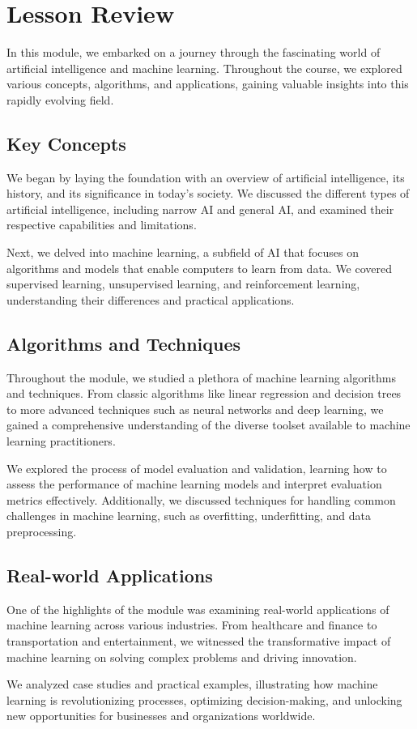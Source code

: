 
\section{Lesson Review}

In this module, we embarked on a journey through the fascinating world of artificial intelligence and machine learning. Throughout the course, we explored various concepts, algorithms, and applications, gaining valuable insights into this rapidly evolving field.

\subsection*{Key Concepts}

We began by laying the foundation with an overview of artificial intelligence, its history, and its significance in today's society. We discussed the different types of artificial intelligence, including narrow AI and general AI, and examined their respective capabilities and limitations.

Next, we delved into machine learning, a subfield of AI that focuses on algorithms and models that enable computers to learn from data. We covered supervised learning, unsupervised learning, and reinforcement learning, understanding their differences and practical applications.

\subsection*{Algorithms and Techniques}

Throughout the module, we studied a plethora of machine learning algorithms and techniques. From classic algorithms like linear regression and decision trees to more advanced techniques such as neural networks and deep learning, we gained a comprehensive understanding of the diverse toolset available to machine learning practitioners.

We explored the process of model evaluation and validation, learning how to assess the performance of machine learning models and interpret evaluation metrics effectively. Additionally, we discussed techniques for handling common challenges in machine learning, such as overfitting, underfitting, and data preprocessing.

\subsection*{Real-world Applications}

One of the highlights of the module was examining real-world applications of machine learning across various industries. From healthcare and finance to transportation and entertainment, we witnessed the transformative impact of machine learning on solving complex problems and driving innovation.

We analyzed case studies and practical examples, illustrating how machine learning is revolutionizing processes, optimizing decision-making, and unlocking new opportunities for businesses and organizations worldwide.
